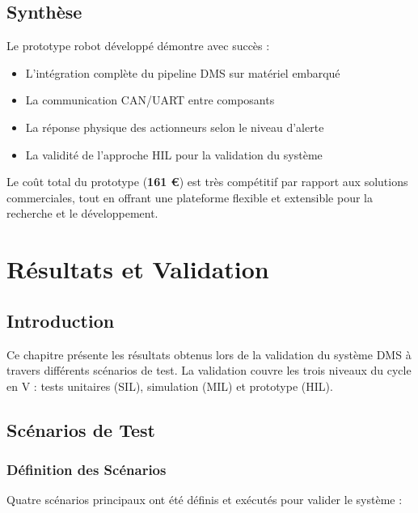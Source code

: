 \documentclass[12pt,a4paper,twoside]{report}
\begin{document}
\section{Synthèse}

Le prototype robot développé démontre avec succès :
\begin{itemize}
    \item L'intégration complète du pipeline DMS sur matériel embarqué
    \item La communication CAN/UART entre composants
    \item La réponse physique des actionneurs selon le niveau d'alerte
    \item La validité de l'approche HIL pour la validation du système
\end{itemize}

Le coût total du prototype (\textbf{161 €}) est très compétitif par rapport aux solutions commerciales, tout en offrant une plateforme flexible et extensible pour la recherche et le développement.


\chapter{Résultats et Validation}

\section{Introduction}

Ce chapitre présente les résultats obtenus lors de la validation du système DMS à travers différents scénarios de test. La validation couvre les trois niveaux du cycle en V : tests unitaires (SIL), simulation (MIL) et prototype (HIL).

\section{Scénarios de Test}

\subsection{Définition des Scénarios}

Quatre scénarios principaux ont été définis et exécutés pour valider le système :
\end{document}
